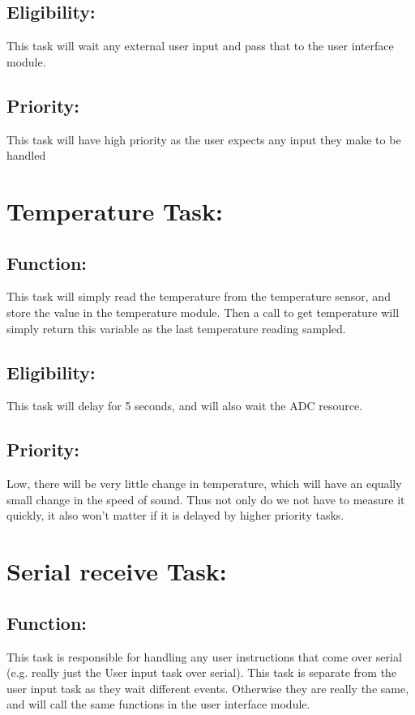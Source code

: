 \documentclass[]{article}
\begin{document}
\subsection{Eligibility:}
This task will wait any external user input and pass that to the user interface module.

\subsection{Priority:}
This task will have high priority as the user expects any input they make to be handled 

\newpage
\section{Temperature Task:}

\subsection{Function:}
This task will simply read the temperature from the temperature sensor, and store the value in the temperature module. Then a call to get temperature will simply return this variable as the last temperature reading sampled.

\subsection{Eligibility:}
This task will delay for 5 seconds, and will also wait the ADC resource.

\subsection{Priority:}
Low, there will be very little change in temperature, which will have an equally small change in the speed of sound. Thus not only do we not have to measure it quickly, it also won't matter if it is delayed by higher priority tasks.

\newpage
\section{Serial receive Task:}

\subsection{Function:}
This task is responsible for handling any user instructions that come over serial (e.g. really just the User input task over serial). This task is separate from the user input task as they wait different events. Otherwise they are really the same, and will call the same functions in the user interface module.
\end{document}
